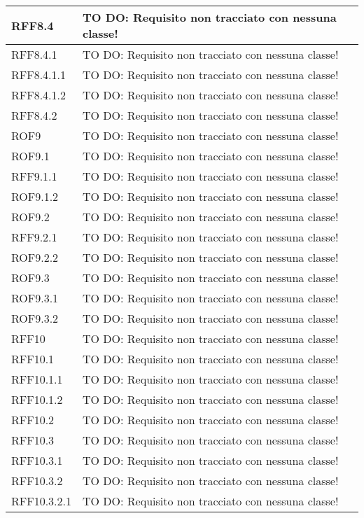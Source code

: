 \begin{center}
\begin{longtable}{| p{2.5cm} | p{11cm} |}
\hline
RFF8.4 & TO DO: Requisito non tracciato con nessuna classe! \\
\hline
RFF8.4.1 & TO DO: Requisito non tracciato con nessuna classe! \\
\hline
RFF8.4.1.1 & TO DO: Requisito non tracciato con nessuna classe! \\
\hline
RFF8.4.1.2 & TO DO: Requisito non tracciato con nessuna classe! \\
\hline
RFF8.4.2 & TO DO: Requisito non tracciato con nessuna classe! \\
\hline
ROF9 & TO DO: Requisito non tracciato con nessuna classe! \\
\hline
ROF9.1 & TO DO: Requisito non tracciato con nessuna classe! \\
\hline
RFF9.1.1 & TO DO: Requisito non tracciato con nessuna classe! \\
\hline
ROF9.1.2 & TO DO: Requisito non tracciato con nessuna classe! \\
\hline
ROF9.2 & TO DO: Requisito non tracciato con nessuna classe! \\
\hline
RFF9.2.1 & TO DO: Requisito non tracciato con nessuna classe! \\
\hline
ROF9.2.2 & TO DO: Requisito non tracciato con nessuna classe! \\
\hline
ROF9.3 & TO DO: Requisito non tracciato con nessuna classe! \\
\hline
ROF9.3.1 & TO DO: Requisito non tracciato con nessuna classe! \\
\hline
ROF9.3.2 & TO DO: Requisito non tracciato con nessuna classe! \\
\hline
RFF10 & TO DO: Requisito non tracciato con nessuna classe! \\
\hline
RFF10.1 & TO DO: Requisito non tracciato con nessuna classe! \\
\hline
RFF10.1.1 & TO DO: Requisito non tracciato con nessuna classe! \\
\hline
RFF10.1.2 & TO DO: Requisito non tracciato con nessuna classe! \\
\hline
RFF10.2 & TO DO: Requisito non tracciato con nessuna classe! \\
\hline
RFF10.3 & TO DO: Requisito non tracciato con nessuna classe! \\
\hline
RFF10.3.1 & TO DO: Requisito non tracciato con nessuna classe! \\
\hline
RFF10.3.2 & TO DO: Requisito non tracciato con nessuna classe! \\
\hline
RFF10.3.2.1 & TO DO: Requisito non tracciato con nessuna classe! \\

\end{longtable}
\end{center}
